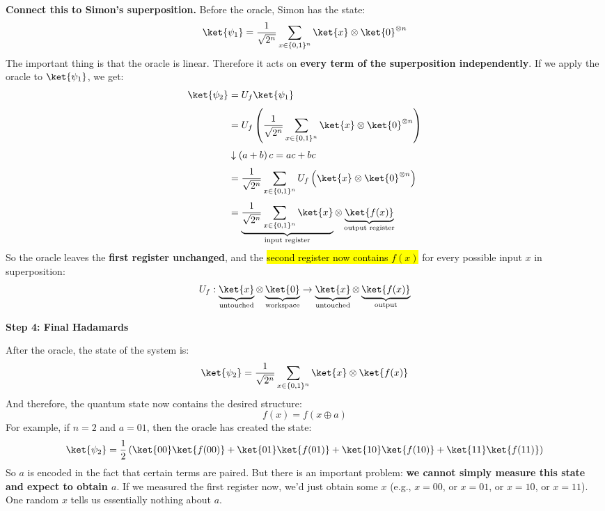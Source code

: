 \highspace
\textcolor{Green3}{ \textbf{Connect this to Simon's superposition.}} Before the oracle, Simon has the state:
\begin{equation*}
    \ket{\psi_1} = \frac{1}{\sqrt{2^n}} \sum_{x \in \{0,1\}^n} \ket{x} \otimes \ket{0}^{\otimes n}
\end{equation*}
The important thing is that the oracle is linear. Therefore it acts on \textbf{every term of the superposition independently}. If we apply the oracle to $\ket{\psi_1}$, we get:
\begin{align*}
    \ket{\psi_2} &= U_f \ket{\psi_1} \\[.3em]
    &= U_f \left( \frac{1}{\sqrt{2^n}} \sum_{x \in \{0,1\}^n} \ket{x} \otimes \ket{0}^{\otimes n} \right) \\[.3em]
    &\downarrow \left(a +b\right) c = ac + bc \\[.3em]
    &= \frac{1}{\sqrt{2^n}} \sum_{x \in \{0,1\}^n} U_f \left( \ket{x} \otimes \ket{0}^{\otimes n} \right) \\[.3em]
    &= \underbrace{\frac{1}{\sqrt{2^n}} \sum_{x \in \{0,1\}^n} \ket{x}}_{\text{input register}} \otimes \underbrace{\ket{f(x)}}_{\text{output register}}
\end{align*}
So the oracle leaves the \textbf{first register unchanged}, and the \hl{second register now contains $f(x)$} for every possible input $x$ in superposition:
\begin{equation*}
    U_f : \underbrace{\ket{x}}_{\text{untouched}} \otimes \underbrace{\ket{0}}_{\text{workspace}} \to \underbrace{\ket{x}}_{\text{untouched}} \otimes \underbrace{\ket{f(x)}}_{\text{output}}
\end{equation*}

\highspace
\begin{flushleft}
    \textcolor{Green3}{ \textbf{Step 4: Final Hadamards}}
\end{flushleft}
After the oracle, the state of the system is:
\begin{equation*}
    \ket{\psi_2} = \frac{1}{\sqrt{2^n}} \sum_{x \in \{0,1\}^n} \ket{x} \otimes \ket{f(x)}
\end{equation*}
And therefore, the quantum state now contains the desired structure:
\begin{equation*}
    f(x) = f(x \oplus a)
\end{equation*}
For example, if $n=2$ and $a=01$, then the oracle has created the state:
\begin{equation*}
    \ket{\psi_2} = \frac{1}{2} \left(\ket{00}\ket{f(00)} + \ket{01}\ket{f(01)} + \ket{10}\ket{f(10)} + \ket{11}\ket{f(11)}\right)
\end{equation*}
So $a$ is encoded in the fact that certain terms are paired. But there is an important problem: \textbf{we cannot simply measure this state and expect to obtain $a$}. If we measured the first register now, we'd just obtain some $x$ (e.g., $x=00$, or $x=01$, or $x=10$, or $x=11$). One random $x$ tells us essentially nothing about $a$.

